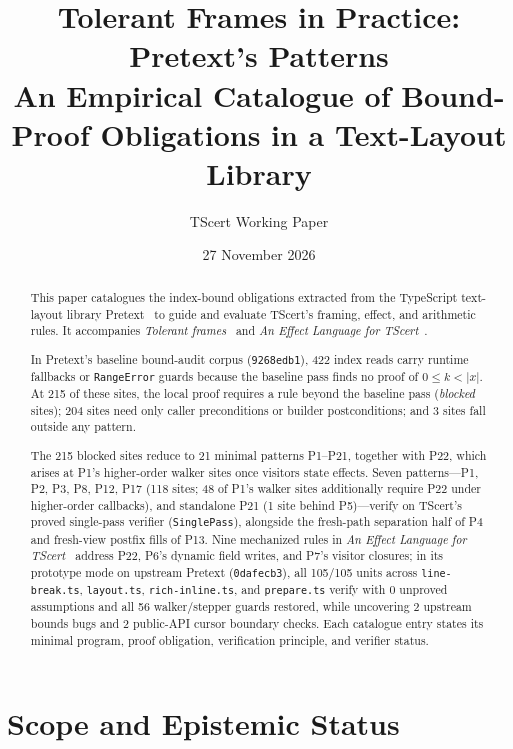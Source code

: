 \documentclass[10pt,a4paper]{article}
\title{\sffamily\bfseries\color{accent}Tolerant Frames in Practice: Pretext's Patterns\\[2pt]
  \large\normalfont\color{black}An Empirical Catalogue of Bound-Proof Obligations in a Text-Layout Library}
\author{TScert Working Paper}
\date{27 November 2026}
\newcommand{\len}[1]{|#1|}
\newcommand{\code}[1]{\textcolor{codec}{\texttt{#1}}}
\newcommand{\lean}[1]{\texttt{\small #1}}
\renewcommand{\lean}[1]{\textcolor{leanc}{\texttt{\small #1}}}%
\begin{document}
\maketitle

\begin{abstract}\noindent
This paper catalogues the index-bound obligations extracted from the
TypeScript text-layout library Pretext~\cite{pretext} to guide and
evaluate TScert's framing, effect, and arithmetic rules. It accompanies
\emph{Tolerant frames}~\cite{tf} and \emph{An Effect Language for
TScert}~\cite{el}.

In Pretext's baseline bound-audit corpus (\code{9268edb1}), 422 index
reads carry runtime fallbacks or \code{RangeError} guards because the
baseline pass finds no proof of $0\le k<\len{x}$. At 215 of these sites,
the local proof requires a rule beyond the baseline pass (\emph{blocked}
sites); 204 sites need only caller preconditions or builder
postconditions; and 3 sites fall outside any pattern.

The 215 blocked sites reduce to 21 minimal patterns P1--P21, together
with P22, which arises at P1's higher-order walker sites once visitors
state effects. Seven patterns---P1, P2, P3, P8, P12, P17 (118 sites; 48
of P1's walker sites additionally require P22 under higher-order
callbacks), and standalone P21 (1 site behind P5)---verify on TScert's
proved single-pass verifier (\lean{SinglePass}), alongside the
fresh-path separation half of P4 and fresh-view postfix fills of P13.
Nine mechanized rules in \emph{An Effect Language for TScert}~\cite{el}
address P22, P6's dynamic field writes, and P7's visitor closures; in
its prototype mode on upstream Pretext (\code{0dafecb3}), all 105/105
units across \code{line-break.ts}, \code{layout.ts},
\code{rich-inline.ts}, and \code{prepare.ts} verify with 0 unproved
assumptions and all 56 walker/stepper guards restored, while uncovering
2 upstream bounds bugs and 2 public-API cursor boundary checks. Each
catalogue entry states its minimal program, proof obligation,
verification principle, and verifier status.
\end{abstract}

\section*{Scope and Epistemic Status}
\end{document}
